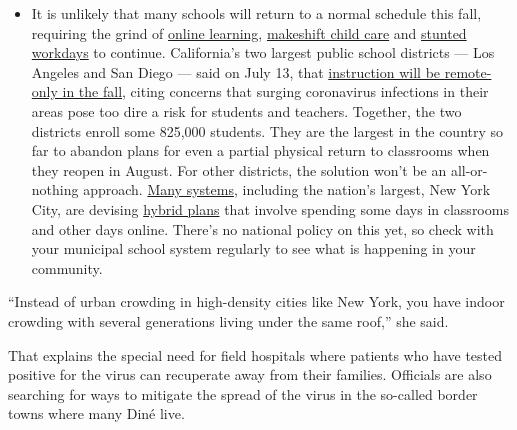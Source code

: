 \begin{itemize}
  \begin{itemize}
  \tightlist
  \item
    It is unlikely that many schools will return to a normal schedule
    this fall, requiring the grind of
    \href{https://www.nytimes.com/2020/06/05/us/coronavirus-education-lost-learning.html?action=click\&pgtype=Article\&state=default\&region=MAIN_CONTENT_3\&context=storylines_faq}{online
    learning},
    \href{https://www.nytimes.com/2020/05/29/us/coronavirus-child-care-centers.html?action=click\&pgtype=Article\&state=default\&region=MAIN_CONTENT_3\&context=storylines_faq}{makeshift
    child care} and
    \href{https://www.nytimes.com/2020/06/03/business/economy/coronavirus-working-women.html?action=click\&pgtype=Article\&state=default\&region=MAIN_CONTENT_3\&context=storylines_faq}{stunted
    workdays} to continue. California's two largest public school
    districts --- Los Angeles and San Diego --- said on July 13, that
    \href{https://www.nytimes.com/2020/07/13/us/lausd-san-diego-school-reopening.html?action=click\&pgtype=Article\&state=default\&region=MAIN_CONTENT_3\&context=storylines_faq}{instruction
    will be remote-only in the fall}, citing concerns that surging
    coronavirus infections in their areas pose too dire a risk for
    students and teachers. Together, the two districts enroll some
    825,000 students. They are the largest in the country so far to
    abandon plans for even a partial physical return to classrooms when
    they reopen in August. For other districts, the solution won't be an
    all-or-nothing approach.
    \href{https://bioethics.jhu.edu/research-and-outreach/projects/eschool-initiative/school-policy-tracker/}{Many
    systems}, including the nation's largest, New York City, are
    devising
    \href{https://www.nytimes.com/2020/06/26/us/coronavirus-schools-reopen-fall.html?action=click\&pgtype=Article\&state=default\&region=MAIN_CONTENT_3\&context=storylines_faq}{hybrid
    plans} that involve spending some days in classrooms and other days
    online. There's no national policy on this yet, so check with your
    municipal school system regularly to see what is happening in your
    community.
  \end{itemize}
\end{itemize}

``Instead of urban crowding in high-density cities like New York, you
have indoor crowding with several generations living under the same
roof,'' she said.

That explains the special need for field hospitals where patients who
have tested positive for the virus can recuperate away from their
families. Officials are also searching for ways to mitigate the spread
of the virus in the so-called border towns where many Diné live.

